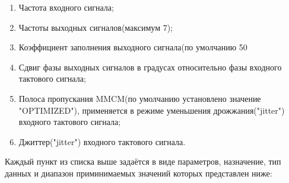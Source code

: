 \documentclass[a4paper,oneside ,14pt]{extreport}
\begin{document}
\begin{enumerate}
	\item Частота входного сигнала;
	\item Частоты выходных сигналов(максимум 7);
	\item Коэффициент заполнения выходного сигнала(по умолчанию 50%
	\item Сдвиг фазы выходных сигналов в градусах относительно фазы входного тактового сигнала;
	\item Полоса пропускания MMCM(по умолчанию установлено значение "OPTIMIZED"), применяется в режиме уменьшения дрожжания("jitter") входного тактового сигнала;
	\item Джиттер("jitter") входного тактового сигнала.
\end{enumerate}

Каждый пункт из списка выше задаётся в виде параметров, назначение, тип данных и диапазон приминимаемых значений которых представлен ниже:
\end{document}

